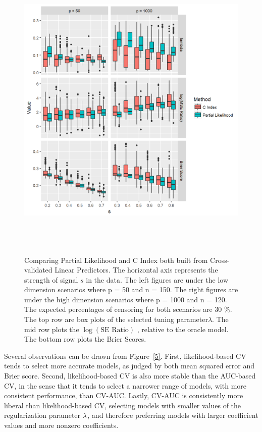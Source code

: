 \begin{figure}[h]
  \centering
  \includegraphics[height= 15cm ]{./manuscript_figure/figure_auc.png}
  \caption{Comparing Partial Likelihood and C Index both built from Cross-validated Linear Predictors. The horizontal axis represents the strength of signal $s$ in the data. The left figures are under the low dimension scenarios where p = 50 and n = 150. The right figures are under the high dimension scenarios where p = 1000 and n = 120. The expected percentages of censoring for both scenarios are 30 $\%$. The top row are box plots of the selected tuning parameter$\lambda$. The mid row plots the $\log(\text{SE Ratio})$ , relative to the oracle model. The bottom row plots the Brier Scores. }
\end{figure}

Several observations can be drawn from Figure~\ref{5}.  First, likelihood-based CV tends to select more accurate models, as judged by both mean squared error and Brier score.  Second, likelihood-based CV is also more stable than the AUC-based CV, in the sense that it tends to select a narrower range of models, with more consistent performance, than CV-AUC.  Lastly, CV-AUC is consistently more liberal than likelihood-based CV, selecting models with smaller values of the regularization parameter $\lambda$, and therefore preferring models with larger coefficient values and more nonzero coefficients.

